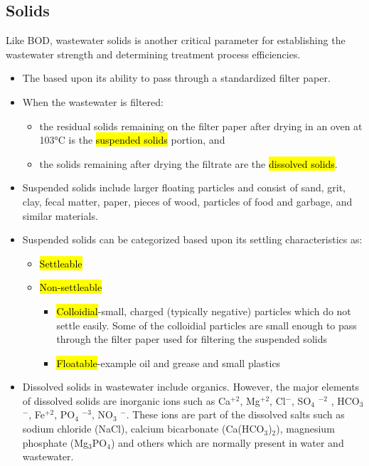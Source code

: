 \subsection{Solids}
		Like BOD, wastewater solids is another critical parameter for establishing the wastewater strength and determining treatment process efficiencies. 
		\begin{itemize}
			\item The  based upon its ability to pass through a standardized filter paper.
			\item When the wastewater is filtered:
			      \begin{itemize}
			      	\item the residual solids remaining on the filter paper after drying in an oven at 103\si{\degree}C is the \hl{suspended solids} portion, and 
			      	\item the solids remaining after drying the filtrate are the \hl{dissolved solids}.
			      \end{itemize}
			\item Suspended solids include larger floating particles and consist of sand, grit, clay, fecal matter, paper, pieces of wood, particles of food and garbage, and similar materials.
			\item Suspended solids can be categorized based upon its settling characteristics as:
			      \begin{itemize}
			      	\item \hl{Settleable}
			      	\item \hl{Non-settleable}
			      	      \begin{itemize}
			      	      	\item \hl{Colloidial}-small, charged (typically negative) particles which do not settle easily.  Some of the colloidial particles are small enough to pass through the filter paper used for filtering the suspended solids
			      	      	\item \hl{Floatable}-example oil and grease and small plastics
			      	      \end{itemize}
			      \end{itemize}
			\item Dissolved solids in wastewater include organics.  However, the major elements of dissolved solids are inorganic ions such as Ca$^{+2}$, Mg$^{+2}$, Cl$^-$, SO$_4$ $^{-2}$ , HCO$_3$ $^-$, Fe$^{+2}$, PO$_4$ $^{-3}$, NO$_3$ $^-$.  These ions are part of the dissolved salts such as sodium chloride (NaCl), calcium bicarbonate (Ca(HCO$_3$)$_2$), magnesium phosphate (Mg$_3$PO$_4$) and others which are normally present in water and wastewater. 

\end{itemize}
